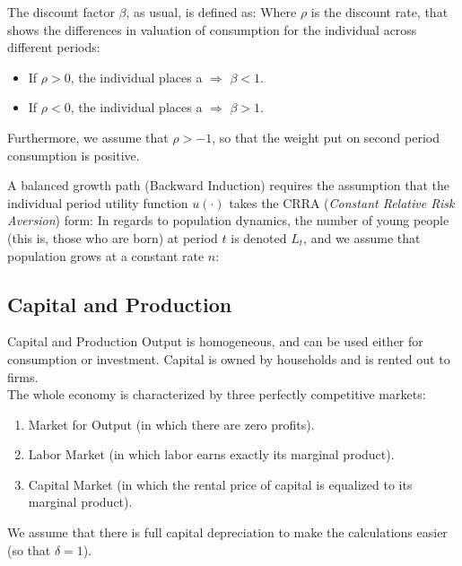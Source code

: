 \documentclass[10pt,usenames,dvipsnames]{beamer}
\begin{document}
\begin{frame}
The \alert{discount factor} $\beta$, as usual, is defined as:
\pause
Where $\rho$ is the \alert{discount rate}, that shows the differences in valuation of consumption for the individual across different periods:
\begin{itemize}
\item If $\rho>0$, the individual places a  $\Rightarrow$ $\beta<1$.
\item If $\rho<0$, the individual places a  $\Rightarrow$ $\beta>1$.
\end{itemize}
\bigskip
\pause
Furthermore, we assume that $\rho>-1$, so that the weight put on second period consumption is positive. \\
\end{frame}

\begin{frame}
A \alert{balanced growth path} (Backward Induction) requires the assumption that the individual period utility function $u(\cdot)$ takes the CRRA (\textit{Constant Relative Risk Aversion}) form:
\pause
In regards to \alert{population dynamics}, the number of young people (this is, those who are born) at period $t$ is denoted $L_t$, and we assume that population grows at a constant rate $n$:
\end{frame}

\subsection{Capital and Production}
\begin{frame}{Capital and Production}
Output is \alert{homogeneous}, and can be used either for consumption or investment. Capital is owned by households and is rented out to firms.\\
\bigskip
The whole economy is characterized by three perfectly competitive markets:
\begin{enumerate}
\item Market for Output (in which there are zero profits).
\item Labor Market (in which labor earns exactly its marginal product).
\item Capital Market (in which the rental price of capital is equalized to its marginal product).
\end{enumerate}
\pause
\bigskip
We assume that there is \alert{full capital depreciation} to make the calculations easier (so that $\delta=1$).
\end{frame}
\end{document}
